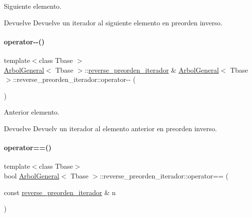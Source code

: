 Siguiente elemento. 

\begin{DoxyReturn}{Devuelve}
Devuelve un iterador al siguiente elemento en preorden inverso. 
\end{DoxyReturn}
\hypertarget{classArbolGeneral_1_1reverse__preorden__iterador_abe501ae99cd71b927e21f882ec4bfec6}{}\label{classArbolGeneral_1_1reverse__preorden__iterador_abe501ae99cd71b927e21f882ec4bfec6} 
\paragraph{\texorpdfstring{operator-\/-\/()}{operator--()}}
{\footnotesize\ttfamily template$<$class Tbase $>$ \\
\hyperlink{classArbolGeneral}{Arbol\+General}$<$ Tbase $>$\+::\hyperlink{classArbolGeneral_1_1reverse__preorden__iterador}{reverse\+\_\+preorden\+\_\+iterador} \& \hyperlink{classArbolGeneral}{Arbol\+General}$<$ Tbase $>$\+::reverse\+\_\+preorden\+\_\+iterador\+::operator-\/-\/ (\begin{DoxyParamCaption}{ }\end{DoxyParamCaption})}



Anterior elemento. 

\begin{DoxyReturn}{Devuelve}
Devuelv un iterador al elemento anterior en preorden inverso. 
\end{DoxyReturn}
\hypertarget{classArbolGeneral_1_1reverse__preorden__iterador_a9ed2cebf9531952f629c3f3f20eccb3d}{}\label{classArbolGeneral_1_1reverse__preorden__iterador_a9ed2cebf9531952f629c3f3f20eccb3d} 
\paragraph{\texorpdfstring{operator==()}{operator==()}}
{\footnotesize\ttfamily template$<$class Tbase$>$ \\
bool \hyperlink{classArbolGeneral}{Arbol\+General}$<$ Tbase $>$\+::reverse\+\_\+preorden\+\_\+iterador\+::operator== (\begin{DoxyParamCaption}\item[{const \hyperlink{classArbolGeneral_1_1reverse__preorden__iterador}{reverse\+\_\+preorden\+\_\+iterador} \&}]{n }\end{DoxyParamCaption})\hspace{0.3cm}{\ttfamily [inline]}}




